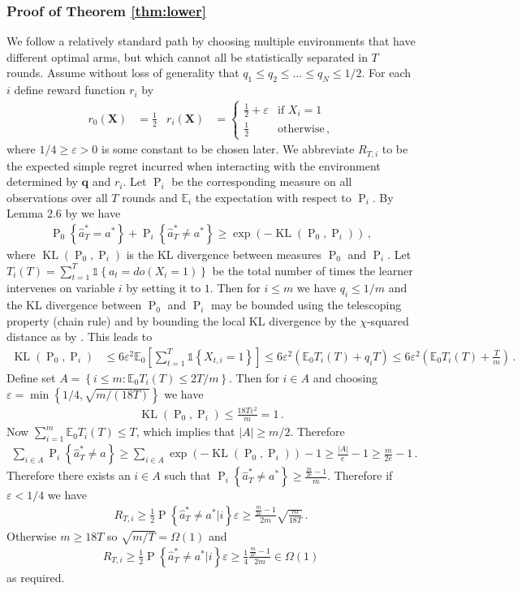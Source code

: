 \documentclass[11pt,a4paper,twoside]{report}
\newcommand{\KL}{\operatorname{KL}}
\newcommand{\EE}{\mathbb E}
\newcommand{\Pn}[2]{\operatorname{P}\left\{#2|#1\right\}}
\newcommand{\Ps}{\operatorname{P}}
\newcommand{\Pri}[1]{\operatorname{P}_i\left\{#1\right\}}
\newcommand{\Prz}[1]{\operatorname{P}_0\left\{#1\right\}}
\newcommand{\set}[1]{\left\{#1\right\}}
\newcommand{\ind}[1]{\mathds{1}\!\!\set{#1}}
\newcommand{\eq}[1]{\begin{align*}#1\end{align*}}
\theoremstyle{plain}
\theoremstyle{definition}
\let\epsilon\varepsilon
\begin{document}
\subsubsection{Proof of Theorem \ref{thm:lower}}\label{sec:thm:lower}

We follow a relatively standard path by choosing multiple environments that have different optimal arms, but which cannot all be statistically
separated in $T$ rounds.
Assume without loss of generality that $q_1 \leq q_2 \leq \ldots \leq q_N \leq 1/2$.
For each $i$ define reward function $r_i$ by
\eq{
r_0(\boldsymbol{X}) &= \frac{1}{2} &
r_i(\boldsymbol{X}) &= \begin{cases}
\frac{1}{2} + \epsilon & \text{if } X_i = 1 \\
\frac{1}{2} & \text{otherwise}\,,
\end{cases}
}
where $1/4 \geq \epsilon > 0$ is some constant to be chosen later.
We abbreviate $R_{T,i}$ to be the expected simple regret incurred when interacting with the
environment determined by $\boldsymbol{q}$ and $r_i$. Let $\operatorname{P}_i$ be the corresponding measure
on all observations over all $T$ rounds and $\EE_i$ the expectation with respect to $\operatorname{P}_i$. By Lemma 2.6 by \citet{Tsy08} we have
\eq{
\Prz{\hat a^*_T = a^*} + \Pri{\hat a^*_T \neq a^*} \geq \exp\left(-\KL(\operatorname{P}_0, \operatorname{P}_i)\right)\,,
}
where $\KL(\Ps_0, \Ps_i)$ is the KL divergence between measures $\operatorname{P}_0$ and $\operatorname{P}_i$.
Let $T_i(T) = \sum_{t=1}^T \ind{a_t = do(X_i = 1)}$ be the total number of times the learner intervenes on variable $i$ by setting it to $1$.
Then for $i \leq m$ we have $q_i \leq 1/m$ and the KL divergence between $\Ps_0$ and $\Ps_i$ may be bounded using the telescoping property (chain rule) and
by bounding the local KL divergence by the $\chi$-squared distance as by \citet{Auer1995}. This leads to 
\eq{
\KL(\Ps_0, \Ps_i) 
&\leq 6\epsilon^2 \EE_0\left[\sum_{t=1}^T \ind{X_{t,i} = 1}\right] 
\leq 6\epsilon^2 \left(\EE_0 T_i(T) + q_i T\right) 
\leq 6\epsilon^2 \left(\EE_0 T_i(T) + \frac{T}{m}\right)\,.
}
Define set $A = \set{i \leq m : \EE_0 T_i(T) \leq 2T / m}$.
Then for $i \in A$ and choosing $\epsilon = \min\set{1/4, \sqrt{m/(18T)}}$ we have
\eq{
\KL(\Ps_0, \Ps_i) \leq \frac{18T\epsilon^2}{m} = 1\,. 
}
Now $\sum_{i=1}^m \EE_0 T_i(T) \leq T$, which implies that $|A| \geq m/2$.
Therefore
\eq{
\sum_{i \in A} \Pri{\hat a^*_T \neq a} 
\geq \sum_{i \in A} \exp\left(-\KL(\Ps_0, \Ps_i)\right) - 1
\geq \frac{|A|}{e} - 1 
\geq \frac{m}{2e} - 1\,.
}
Therefore there exists an $i \in A$ such that
$\Pri{\hat a^*_T \neq a^*} \geq \frac{\frac{m}{2e} - 1}{m}$. 
Therefore if $\epsilon < 1/4$ we have
\eq{
R_{T,i} \geq \frac{1}{2} \Pn{i}{\hat a^*_T \neq a^*} \epsilon \geq \frac{\frac{m}{2e} - 1}{2m} \sqrt{\frac{m}{18T}}\,.
}
Otherwise $m \geq 18T$ so $\sqrt{m/T} = \Omega(1)$ and
\eq{
R_{T,i} \geq \frac{1}{2} \Pn{i}{\hat a^*_T \neq a^*} \epsilon \geq \frac{1}{4} \frac{\frac{m}{2e} - 1}{2m} \in \Omega(1) 
}
as required.
\end{document}
